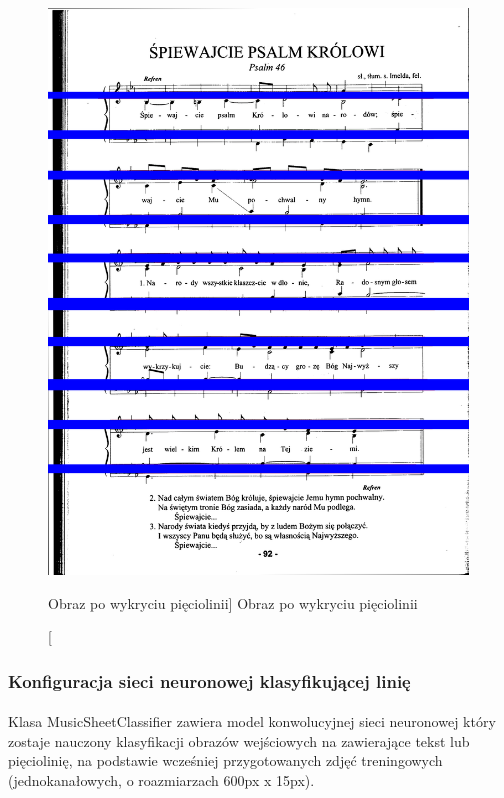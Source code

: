 \documentclass[a4paper,12pt]{article}
\begin{document}
		    \begin{figure}[!ht]  
			    \begin{center}
				    \includegraphics[height=15cm, frame] {image//exampleImage//004_b.png} 
			    \end{center}
			    \caption
    			    [Obraz po wykryciu pięciolinii]  
    			    {Obraz po wykryciu pięciolinii}  
		    \end{figure} 
		
		\subsubsection{Konfiguracja sieci neuronowej klasyfikującej linię}  
	        \paragraph{\indent} Klasa MusicSheetClassifier zawiera model konwolucyjnej sieci neuronowej który           zostaje nauczony klasyfikacji obrazów wejściowych na zawierające        tekst lub  pięciolinię, na podstawie wcześniej przygotowanych zdjęć         treningowych (jednokanałowych, o roazmiarzach 600px x 15px).
	        \newpage
		
\end{document}

